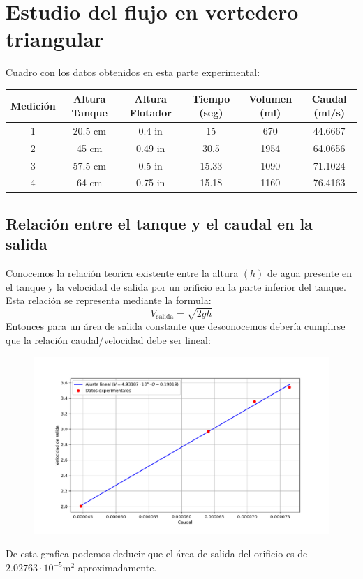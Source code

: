 \documentclass[a4paper,12pt]{report}
\begin{document}
\section{Estudio del flujo en vertedero triangular}
Cuadro con los datos obtenidos en esta parte experimental:
\begin{center}
\begin{tabular}{|c|c|c|c|c|c|}
\hline 
Medición & Altura Tanque & Altura Flotador & Tiempo (seg) & Volumen (ml) & Caudal (ml/s) \\ 
\hline 
1 & 20.5 cm & 0.4 in & 15 & 670 & 44.6667 \\ 
\hline 
2 & 45 cm & 0.49 in & 30.5 & 1954 & 64.0656 \\ 
\hline 
3 & 57.5 cm & 0.5 in & 15.33 & 1090 & 71.1024 \\ 
\hline 
4 & 64 cm & 0.75 in & 15.18 & 1160 & 76.4163 \\ 
\hline 
\end{tabular} 
\end{center}
\subsection{Relación entre el tanque y el caudal en la salida}
Conocemos la relación teorica existente entre la altura $(h)$ de agua presente en el tanque y la velocidad de salida por un orificio en la parte inferior del tanque. Esta relación se representa mediante la formula:
$$
V_{\mathrm{salida}} = \sqrt{2gh}
$$
Entonces para un área de salida constante que desconocemos debería cumplirse que la relación caudal/velocidad debe ser lineal:
\begin{figure}[H]
\centering
\includegraphics[scale=0.7]{velocidadcaudal.pdf}
\end{figure}
De esta grafica podemos deducir que el área de salida del orificio es de $2.02763\cdot 10^{-5} \mathrm{m^{2}}$ aproximadamente.
\end{document}
